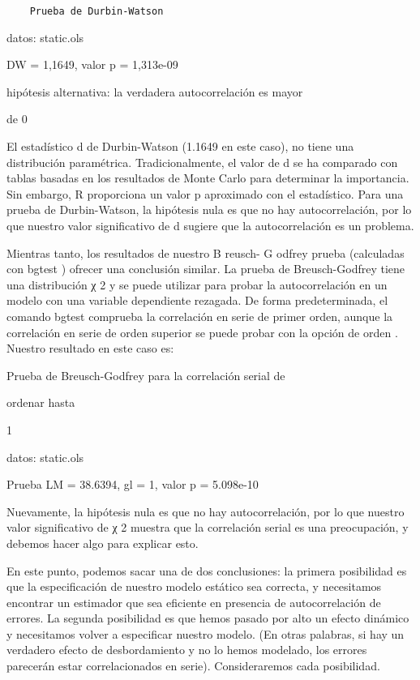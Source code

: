 \documentclass[
]{book}
\begin{document}
\begin{verbatim}
    Prueba de Durbin-Watson
\end{verbatim}

datos: static.ols

DW = 1,1649, valor p = 1,313e-09

hipótesis alternativa: la verdadera autocorrelación es mayor

de 0

El estadístico d de Durbin-Watson (1.1649 en este caso), no tiene una distribución paramétrica. Tradicionalmente, el valor de d se ha comparado con tablas basadas en los resultados de Monte Carlo para determinar la importancia. Sin embargo, R proporciona un valor p aproximado con el estadístico. Para una prueba de Durbin-Watson, la hipótesis nula es que no hay autocorrelación, por lo que nuestro valor significativo de d sugiere que la autocorrelación es un problema.

Mientras tanto, los resultados de nuestro B reusch- G odfrey prueba (calculadas con bgtest ) ofrecer una conclusión similar. La prueba de Breusch-Godfrey tiene una distribución χ 2 y se puede utilizar para probar la autocorrelación en un modelo con una variable dependiente rezagada. De forma predeterminada, el comando bgtest comprueba la correlación en serie de primer orden, aunque la correlación en serie de orden superior se puede probar con la opción de orden . Nuestro resultado en este caso es:

Prueba de Breusch-Godfrey para la correlación serial de

ordenar hasta

1

datos: static.ols

Prueba LM = 38.6394, gl = 1, valor p = 5.098e-10

Nuevamente, la hipótesis nula es que no hay autocorrelación, por lo que nuestro valor significativo de χ 2 muestra que la correlación serial es una preocupación, y debemos hacer algo para explicar esto.

En este punto, podemos sacar una de dos conclusiones: la primera posibilidad es que la especificación de nuestro modelo estático sea \hspace{0pt}\hspace{0pt}correcta, y necesitamos encontrar un estimador que sea eficiente en presencia de autocorrelación de errores. La segunda posibilidad es que hemos pasado por alto un efecto dinámico y necesitamos volver a especificar nuestro modelo. (En otras palabras, si hay un verdadero efecto de desbordamiento y no lo hemos modelado, los errores parecerán estar correlacionados en serie). Consideraremos cada posibilidad.
\end{document}
